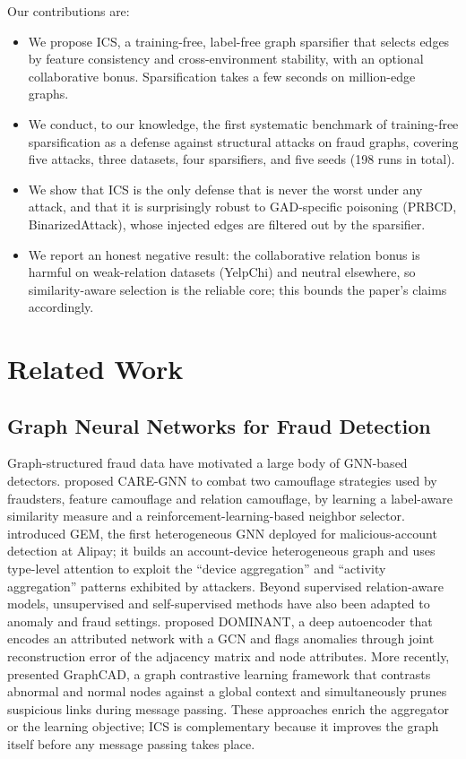 \documentclass[11pt]{article}
\begin{document}
Our contributions are:
\begin{itemize}
    \item We propose ICS, a training-free, label-free graph sparsifier that selects edges by feature consistency and cross-environment stability, with an optional collaborative bonus. Sparsification takes a few seconds on million-edge graphs.
    \item We conduct, to our knowledge, the first systematic benchmark of training-free sparsification as a defense against structural attacks on fraud graphs, covering five attacks, three datasets, four sparsifiers, and five seeds (198 runs in total).
    \item We show that ICS is the only defense that is never the worst under any attack, and that it is surprisingly robust to GAD-specific poisoning (PRBCD, BinarizedAttack), whose injected edges are filtered out by the sparsifier.
    \item We report an honest negative result: the collaborative relation bonus is harmful on weak-relation datasets (YelpChi) and neutral elsewhere, so similarity-aware selection is the reliable core; this bounds the paper's claims accordingly.
\end{itemize}

\section{Related Work}\label{sec:related}

\subsection{Graph Neural Networks for Fraud Detection}

Graph-structured fraud data have motivated a large body of GNN-based detectors. \cite{dou2020caregnn} proposed CARE-GNN to combat two camouflage strategies used by fraudsters, feature camouflage and relation camouflage, by learning a label-aware similarity measure and a reinforcement-learning-based neighbor selector. \cite{liu2021fraudreview} introduced GEM, the first heterogeneous GNN deployed for malicious-account detection at Alipay; it builds an account-device heterogeneous graph and uses type-level attention to exploit the ``device aggregation'' and ``activity aggregation'' patterns exhibited by attackers. Beyond supervised relation-aware models, unsupervised and self-supervised methods have also been adapted to anomaly and fraud settings. \cite{ding2019deep} proposed DOMINANT, a deep autoencoder that encodes an attributed network with a GCN and flags anomalies through joint reconstruction error of the adjacency matrix and node attributes. More recently, \cite{chen2021graphcad} presented GraphCAD, a graph contrastive learning framework that contrasts abnormal and normal nodes against a global context and simultaneously prunes suspicious links during message passing. These approaches enrich the aggregator or the learning objective; ICS is complementary because it improves the graph itself before any message passing takes place.
\end{document}

